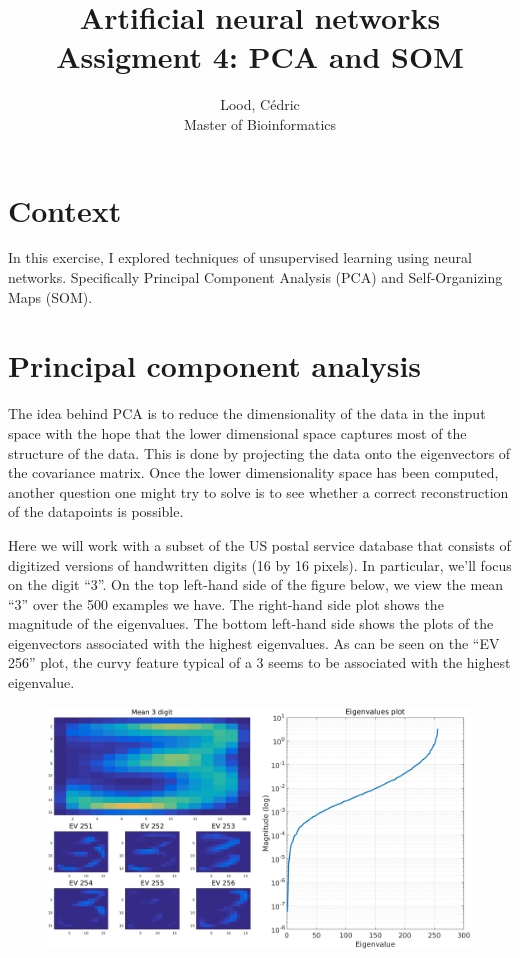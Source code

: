 \documentclass[11pt, a4paper]{article}
\title{ \huge Artificial neural networks \\ 
  { \large Assigment 4: PCA and SOM }}
\author{
        Lood, Cédric \\
        \small Master of Bioinformatics
}
\begin{document}
\maketitle

\section{Context}

In this exercise, I explored techniques of unsupervised learning using
neural networks. Specifically Principal Component Analysis (PCA) and
Self-Organizing Maps (SOM).

\section{Principal component analysis}

The idea behind PCA is to reduce the dimensionality of the data in the
input space with the hope that the lower dimensional space captures
most of the structure of the data. This is done by projecting the data
onto the eigenvectors of the covariance matrix. Once the lower
dimensionality space has been computed, another question one might try
to solve is to see whether a correct reconstruction of the datapoints
is possible.

Here we will work with a subset of the US postal service database that
consists of digitized versions of handwritten digits (16 by 16
pixels). In particular, we'll focus on the digit ``3''. On the top
left-hand side of the figure below, we view the mean ``3'' over the
500 examples we have. The right-hand side plot shows the magnitude of
the eigenvalues. The bottom left-hand side shows the plots of the
eigenvectors associated with the highest eigenvalues. As can be seen
on the ``EV 256'' plot, the curvy feature typical of a 3 seems to be
associated with the highest eigenvalue.

\begin{figure}[H]
    \centering
    \includegraphics[scale=.25]{mean_threess.png}
    \label{fig:mean_three}
\end{figure}
\end{document}
